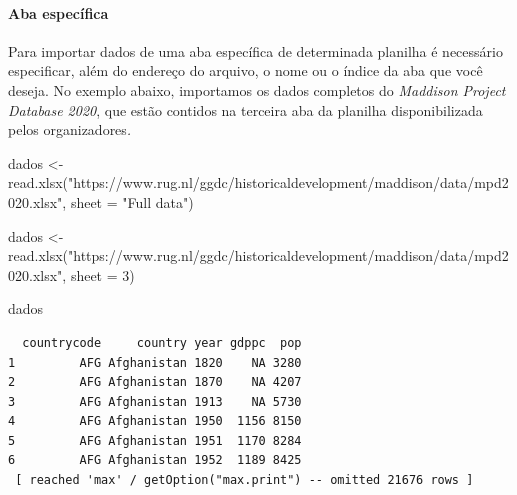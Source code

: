 \documentclass[
  letterpaper,
  DIV=11,
  numbers=noendperiod]{scrreprt}
\let\oldparagraph\paragraph
\renewcommand{\paragraph}[1]{\oldparagraph{#1}\mbox{}}
\newenvironment{Shaded}{\begin{snugshade}}{\end{snugshade}}
\newcommand{\AttributeTok}[1]{\textcolor[rgb]{0.40,0.45,0.13}{#1}}
\newcommand{\DecValTok}[1]{\textcolor[rgb]{0.68,0.00,0.00}{#1}}
\newcommand{\FunctionTok}[1]{\textcolor[rgb]{0.28,0.35,0.67}{#1}}
\newcommand{\NormalTok}[1]{\textcolor[rgb]{0.00,0.23,0.31}{#1}}
\newcommand{\OtherTok}[1]{\textcolor[rgb]{0.00,0.23,0.31}{#1}}
\newcommand{\StringTok}[1]{\textcolor[rgb]{0.13,0.47,0.30}{#1}}
\begin{document}
\paragraph{Aba específica}\label{aba-especuxedfica}

Para importar dados de uma aba específica de determinada planilha é
necessário especificar, além do endereço do arquivo, o nome ou o índice
da aba que você deseja. No exemplo abaixo, importamos os dados completos
do \emph{Maddison Project Database 2020}, que estão contidos na terceira
aba da planilha disponibilizada pelos organizadores\emph{.}

\begin{Shaded}
\begin{Highlighting}[]
\NormalTok{dados }\OtherTok{\textless{}{-}} \FunctionTok{read.xlsx}\NormalTok{(}\StringTok{"https://www.rug.nl/ggdc/historicaldevelopment/maddison/data/mpd2020.xlsx"}\NormalTok{, }
                   \AttributeTok{sheet =} \StringTok{"Full data"}\NormalTok{)}

\NormalTok{dados }\OtherTok{\textless{}{-}} \FunctionTok{read.xlsx}\NormalTok{(}\StringTok{"https://www.rug.nl/ggdc/historicaldevelopment/maddison/data/mpd2020.xlsx"}\NormalTok{, }
                   \AttributeTok{sheet =} \DecValTok{3}\NormalTok{)}

\NormalTok{dados}
\end{Highlighting}
\end{Shaded}

\begin{verbatim}
  countrycode     country year gdppc  pop
1         AFG Afghanistan 1820    NA 3280
2         AFG Afghanistan 1870    NA 4207
3         AFG Afghanistan 1913    NA 5730
4         AFG Afghanistan 1950  1156 8150
5         AFG Afghanistan 1951  1170 8284
6         AFG Afghanistan 1952  1189 8425
 [ reached 'max' / getOption("max.print") -- omitted 21676 rows ]
\end{verbatim}
\end{document}
